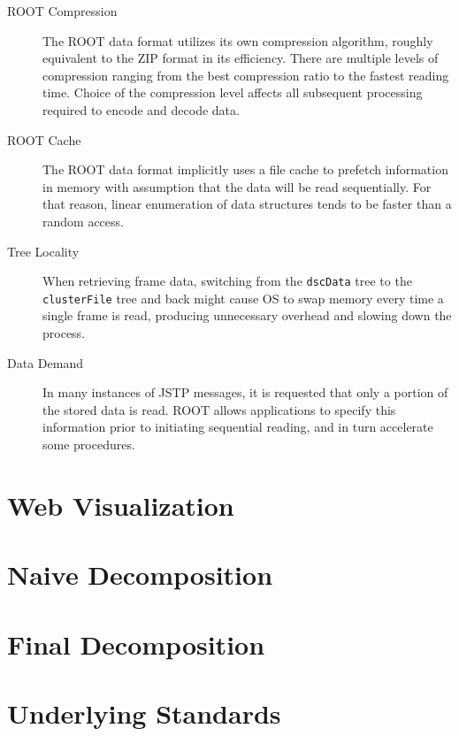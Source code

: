 \begin{description}
	\item[ROOT Compression]
	The ROOT data format utilizes its own compression algorithm, roughly equivalent to the ZIP format in its efficiency. There are multiple levels of compression ranging from the best compression ratio to the fastest reading time. Choice of the compression level affects all subsequent processing required to encode and decode data.

	\item[ROOT Cache]
	The ROOT data format implicitly uses a file cache to prefetch information in memory with assumption that the data will be read sequentially. For that reason, linear enumeration of data structures tends to be faster than a random access.

	\item[Tree Locality]
	When retrieving frame data, switching from the \texttt{dscData} tree to the \texttt{clusterFile} tree and back might cause OS to swap memory every time a single frame is read, producing unnecessary overhead and slowing down the process.

	\item[Data Demand]
	In many instances of JSTP messages, it is requested that only a portion of the stored data is read. ROOT allows applications to specify this information prior to initiating sequential reading, and in turn accelerate some procedures.
\end{description}

\section{Web Visualization}
\label{chapter:web-visualization}

\section{Naive Decomposition}

\section{Final Decomposition}

\section{Underlying Standards}

